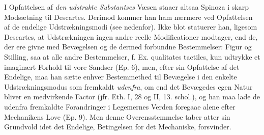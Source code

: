 \documentclass[12pt,a4paper]{book}
\newcommand{\opage}[1]{\marginnote{\footnotesize\textit{[#1]}}}
\begin{document}
\opage{76} \setcounter{footnote}{0}%
I Opfattelsen af \emph{den udstrakte Substantses} Væsen staaer altsaa
Spinoza i skarp Modsætning til Descartes. Derimod kommer han ham
nærmere ved Opfattelsen af de endelige Udstrækningsmodi (see
nedenfor). Ikke blot statuerer han, ligesom Descartes, at
Udstrækningen ingen andre reelle Modificationer modtager, end de,
der ere givne med Bevægelsen og de dermed forbundne Bestemmelser:
Figur og Stilling, saa at alle andre Bestemmelser, f. Ex.
qualitates tactiles, kun udtrykke et imaginært Forhold til vore
Sandser (Ep. 6), men, efter sin Opfattelse af det Endelige, maa
han sætte enhver Bestemmethed til Bevægelse i den enkelte
Udstrækningsmodus som fremkaldt \emph{udenfra}, om end det Bevægedes
egen Natur bliver en medvirkende Factor (jfr. Eth. I, 28 og II,
13. schol.), og han maa lade de udenfra fremkaldte Forandringer i
Legemernes Verden foregaae alene efter Mechanikens Love (Ep. 9).
Men denne Overensstemmelse taber atter sin Grundvold idet det
Endelige, Betingelsen for det Mechaniske, forsvinder.
\end{document}
